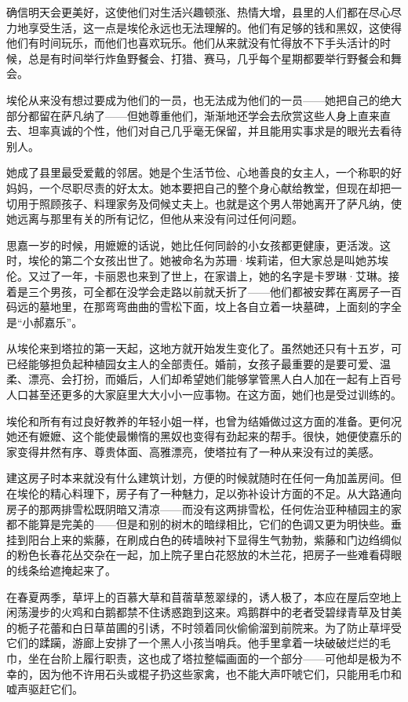 \par 确信明天会更美好，这使他们对生活兴趣顿涨、热情大增，县里的人们都在尽心尽力地享受生活，这一点是埃伦永远也无法理解的。他们有足够的钱和黑奴，这使得他们有时间玩乐，而他们也喜欢玩乐。他们从来就没有忙得放不下手头活计的时候，总是有时间举行炸鱼野餐会、打猎、赛马，几乎每个星期都要举行野餐会和舞会。
\par 埃伦从来没有想过要成为他们的一员，也无法成为他们的一员——她把自己的绝大部分都留在萨凡纳了——但她尊重他们，渐渐地还学会去欣赏这些人身上直来直去、坦率真诚的个性，他们对自己几乎毫无保留，并且能用实事求是的眼光去看待别人。
\par 她成了县里最受爱戴的邻居。她是个生活节俭、心地善良的女主人，一个称职的好妈妈，一个尽职尽责的好太太。她本要把自己的整个身心献给教堂，但现在却把一切用于照顾孩子、料理家务及伺候丈夫上。也就是这个男人带她离开了萨凡纳，使她远离与那里有关的所有记忆，但他从来没有问过任何问题。
\par 思嘉一岁的时候，用嬷嬷的话说，她比任何同龄的小女孩都更健康，更活泼。这时，埃伦的第二个女孩出世了。她被命名为苏珊·埃莉诺，但大家总是叫她苏埃伦。又过了一年，卡丽恩也来到了世上，在家谱上，她的名字是卡罗琳·艾琳。接着是三个男孩，可全都在没学会走路以前就夭折了——他们都被安葬在离房子一百码远的墓地里，在那弯弯曲曲的雪松下面，坟上各自立着一块墓碑，上面刻的字全是“小郝嘉乐”。
\par 从埃伦来到塔拉的第一天起，这地方就开始发生变化了。虽然她还只有十五岁，可已经能够担负起种植园女主人的全部责任。婚前，女孩子最重要的是要可爱、温柔、漂亮、会打扮，而婚后，人们却希望她们能够掌管黑人白人加在一起有上百号人口甚至还更多的大家庭里大大小小一应事物。在这方面，她们也是受过训练的。
\par 埃伦和所有有过良好教养的年轻小姐一样，也曾为结婚做过这方面的准备。更何况她还有嬷嬷、这个能使最懒惰的黑奴也变得有劲起来的帮手。很快，她便使嘉乐的家变得井然有序、尊贵体面、高雅漂亮，使塔拉有了一种从来没有过的美感。
\par 建这房子时本来就没有什么建筑计划，方便的时候就随时在任何一角加盖房间。但在埃伦的精心料理下，房子有了一种魅力，足以弥补设计方面的不足。从大路通向房子的那两排雪松既阴暗又清凉——而没有这两排雪松，任何佐治亚种植园主的家都不能算是完美的——但是和别的树木的暗绿相比，它们的色调又更为明快些。垂挂到阳台上来的紫藤，在刷成白色的砖墙映衬下显得生气勃勃，紫藤和门边绉绸似的粉色长春花丛交杂在一起，加上院子里白花怒放的木兰花，把房子一些难看碍眼的线条给遮掩起来了。
\par 在春夏两季，草坪上的百慕大草和苜蓿草葱翠绿的，诱人极了，本应在屋后空地上闲荡漫步的火鸡和白鹅都禁不住诱惑跑到这来。鸡鹅群中的老者受碧绿青草及甘美的栀子花蕾和白日草苗圃的引诱，不时领着同伙偷偷溜到前院来。为了防止草坪受它们的蹂躏，游廊上安排了一个黑人小孩当哨兵。他手里拿着一块破破烂烂的毛巾，坐在台阶上履行职责，这也成了塔拉整幅画面的一个部分——可他却是极为不幸的，因为他不许用石头或棍子扔这些家禽，也不能大声吓唬它们，只能用毛巾和嘘声驱赶它们。
